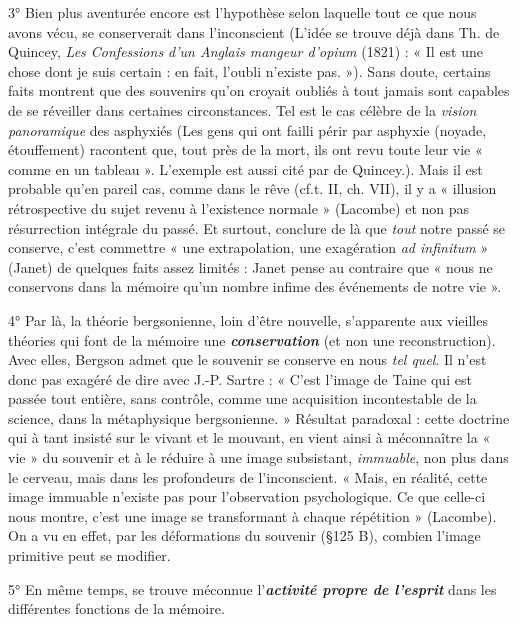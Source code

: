3° Bien plus aventurée encore est l’hypothèse selon laquelle tout
ce que nous avons vécu, se conserverait dans l’inconscient
{\scriptsize (L'idée se trouve déjà dans Th. de Quincey, {\it Les Confessions d'un Anglais mangeur
d'opium} (1821) : « Il est une chose dont je suis certain : en fait, l'oubli n’existe pas. »)}.
Sans
doute, certains faits montrent que des souvenirs qu’on croyait oubliés
à tout jamais sont capables de se réveiller dans certaines circonstances.
Tel est le cas célèbre de la {\it vision panoramique} des asphyxiés
{\scriptsize (Les gens qui ont failli périr par asphyxie (noyade, étouffement) racontent que,
tout près de la mort, ils ont revu toute leur vie « comme en un tableau ». L'exemple est
aussi cité par de Quincey.)}.
Mais il
est probable qu’en pareil cas, comme dans le rêve (cf.t. II, ch. VII),
il y a « illusion rétrospective du sujet revenu à l’existence normale »
(Lacombe) et non pas résurrection intégrale du passé. Et surtout,
conclure de là que {\it tout} notre passé se conserve, c’est commettre « une
extrapolation, une exagération {\it ad infinitum} » (Janet) de quelques
faits assez limités : Janet pense au contraire que « nous ne conservons
dans la mémoire qu’un nombre infime des événements de notre vie ».

4° Par là, la théorie bergsonienne, loin d’être nouvelle, s'apparente
aux vieilles théories qui font de la mémoire une \textbf{\textit {conservation}} (et
non une reconstruction). Avec elles, Bergson admet que le souvenir
se conserve en nous {\it tel quel}. Il n’est donc pas exagéré de dire avec
J.-P. Sartre : « C’est l’image de Taine qui est passée tout entière,
sans contrôle, comme une acquisition incontestable de la science,
dans la métaphysique bergsonienne. » Résultat paradoxal : cette doctrine
qui à tant insisté sur le vivant et le mouvant, en vient ainsi à
méconnaître la « vie » du souvenir et à le réduire à une image subsistant,
{\it immuable}, non plus dans le cerveau, mais dans les profondeurs
de l’inconscient. « Mais, en réalité, cette image immuable n’existe pas
pour l’observation psychologique. Ce que celle-ci nous montre, c’est
une image se transformant à chaque répétition » (Lacombe). On a
vu en effet, par les déformations du souvenir (\S 125 B), combien
l'image primitive peut se modifier.

5° En même temps, se trouve méconnue l’\textbf{\textit {activité propre de l'esprit}}
dans les différentes fonctions de la mémoire.

